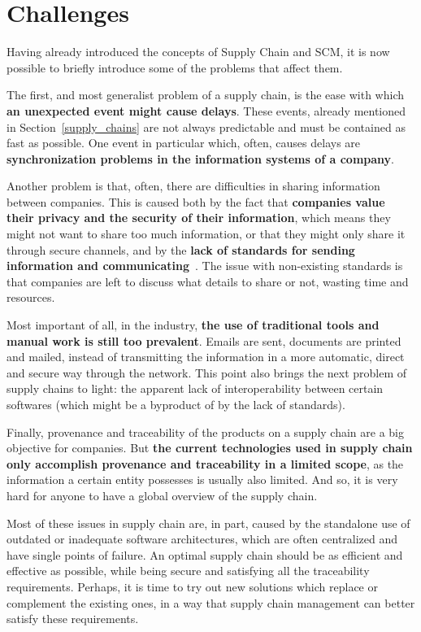 \section{Challenges}
\label{supply_chain_challenges}

 Having already introduced the concepts of Supply Chain and SCM, it is now possible to briefly introduce some of the problems that affect them.

The first, and most generalist problem of a supply chain, is the ease with which \textbf{an unexpected event might cause delays}. These events, already mentioned in Section~\ref{supply_chains} are not always predictable and must be contained as fast as possible. One event in particular which, often, causes delays are \textbf{synchronization problems in the information systems of a company}. 

    Another problem is that, often, there are difficulties in sharing information between companies. This is caused both by the fact that \textbf{companies value their privacy and the security of their information}, which means they might not want to share too much information, or that they might only share it through secure channels, and by the \textbf{lack of standards for sending information and communicating}~\cite{Korpela2017}. The issue with non-existing standards is that companies are left to discuss what details to share or not, wasting time and resources.

Most important of all, in the industry, \textbf{the use of traditional tools and manual work is still too prevalent}. Emails are sent, documents are printed and mailed, instead of transmitting the information in a more automatic, direct and secure way through the network. This point also brings the next problem of supply chains to light: the apparent lack of interoperability between certain softwares (which might be a byproduct of by the lack of standards).
 
 
Finally, provenance and traceability of the products on a supply chain are a big objective for companies. But \textbf{the current technologies used in supply chain only accomplish provenance and traceability in a limited scope}, as the information a certain entity possesses is usually also limited. And so, it is very hard for anyone to have a global overview of the supply chain.

Most of these issues in supply chain are, in part, caused by the standalone use of outdated or inadequate software architectures, which are often centralized and have single points of failure. An optimal supply chain should be as efficient and effective as possible, while being secure and satisfying all the traceability requirements. Perhaps, it is time to try out new solutions which replace or complement the existing ones, in a way that supply chain management can better satisfy these requirements.

